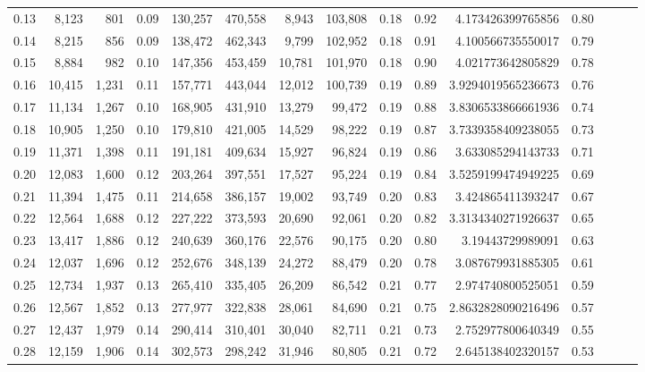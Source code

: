 \begin{tabular}{rrrrrrrrrrrrrrr}
0.13 &   8,123 &    801 &  0.09 &  130,257 &  470,558 &    8,943 &  103,808 &  0.18 &  0.92 &     4.173426399765856 &      0.80 \\
0.14 &   8,215 &    856 &  0.09 &  138,472 &  462,343 &    9,799 &  102,952 &  0.18 &  0.91 &     4.100566735550017 &      0.79 \\
0.15 &   8,884 &    982 &  0.10 &  147,356 &  453,459 &   10,781 &  101,970 &  0.18 &  0.90 &     4.021773642805829 &      0.78 \\
0.16 &  10,415 &  1,231 &  0.11 &  157,771 &  443,044 &   12,012 &  100,739 &  0.19 &  0.89 &    3.9294019565236673 &      0.76 \\
0.17 &  11,134 &  1,267 &  0.10 &  168,905 &  431,910 &   13,279 &   99,472 &  0.19 &  0.88 &    3.8306533866661936 &      0.74 \\
0.18 &  10,905 &  1,250 &  0.10 &  179,810 &  421,005 &   14,529 &   98,222 &  0.19 &  0.87 &    3.7339358409238055 &      0.73 \\
0.19 &  11,371 &  1,398 &  0.11 &  191,181 &  409,634 &   15,927 &   96,824 &  0.19 &  0.86 &     3.633085294143733 &      0.71 \\
0.20 &  12,083 &  1,600 &  0.12 &  203,264 &  397,551 &   17,527 &   95,224 &  0.19 &  0.84 &    3.5259199474949225 &      0.69 \\
0.21 &  11,394 &  1,475 &  0.11 &  214,658 &  386,157 &   19,002 &   93,749 &  0.20 &  0.83 &     3.424865411393247 &      0.67 \\
0.22 &  12,564 &  1,688 &  0.12 &  227,222 &  373,593 &   20,690 &   92,061 &  0.20 &  0.82 &    3.3134340271926637 &      0.65 \\
0.23 &  13,417 &  1,886 &  0.12 &  240,639 &  360,176 &   22,576 &   90,175 &  0.20 &  0.80 &      3.19443729989091 &      0.63 \\
0.24 &  12,037 &  1,696 &  0.12 &  252,676 &  348,139 &   24,272 &   88,479 &  0.20 &  0.78 &     3.087679931885305 &      0.61 \\
0.25 &  12,734 &  1,937 &  0.13 &  265,410 &  335,405 &   26,209 &   86,542 &  0.21 &  0.77 &     2.974740800525051 &      0.59 \\
0.26 &  12,567 &  1,852 &  0.13 &  277,977 &  322,838 &   28,061 &   84,690 &  0.21 &  0.75 &    2.8632828090216496 &      0.57 \\
0.27 &  12,437 &  1,979 &  0.14 &  290,414 &  310,401 &   30,040 &   82,711 &  0.21 &  0.73 &     2.752977800640349 &      0.55 \\
0.28 &  12,159 &  1,906 &  0.14 &  302,573 &  298,242 &   31,946 &   80,805 &  0.21 &  0.72 &     2.645138402320157 &      0.53 \\

\end{tabular}
